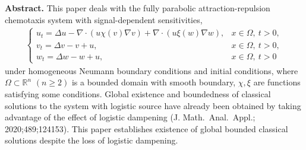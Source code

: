 \documentclass[12pt,reqno,draft]{article}
\numberwithin{equation}{section}
\theoremstyle{theorem}
\theoremstyle{definition}
\begin{document}
\vspace{2pt}
\newenvironment{summary}
{\vspace{.5\baselineskip}\begin{list}{}{%
     \setlength{\baselineskip}{0.85\baselineskip}
     \setlength{\topsep}{0pt}
     \setlength{\leftmargin}{12mm}
     \setlength{\rightmargin}{12mm}
     \setlength{\listparindent}{0mm}
     \setlength{\itemindent}{\listparindent}
     \setlength{\parsep}{0pt}
     \item\relax}}{\end{list}\vspace{.5\baselineskip}}
\begin{summary}
{\footnotesize {\bf Abstract.}
    This paper deals with the fully parabolic attraction-repulsion 
    chemotaxis system with signal-dependent sensitivities,
%
    \begin{align*}
        \begin{cases}
        u_t=\Delta u-\nabla \cdot (u\chi(v)\nabla v)
                         +\nabla \cdot (u\xi(w)\nabla w),
        &x \in \Omega,\ t>0,
    \\[1.05mm]
        v_t=\Delta v-v+u,
        &x \in \Omega,\ t>0,
    \\[1.05mm]
        w_t=\Delta w-w+u,
        &x \in \Omega,\ t>0
        \end{cases}
    \end{align*}
%
    under homogeneous Neumann boundary conditions and initial conditions, 
    where $\Omega \subset \mathbb{R}^n$ $(n \ge 2)$ is a bounded domain with
    smooth boundary, 
    $\chi, \xi$ are functions satisfying some conditions. 
    Global existence and boundedness of classical solutions 
    to the system with logistic source 
    have already been obtained 
    by taking advantage of the effect of logistic dampening 
    (J. Math.\ Anal.\ Appl.; 2020;489;124153). 
    This paper establishes existence of global bounded classical solutions 
    despite the loss of logistic dampening.
}
\end{summary}
\vspace{10pt}

\newpage
\end{document}
